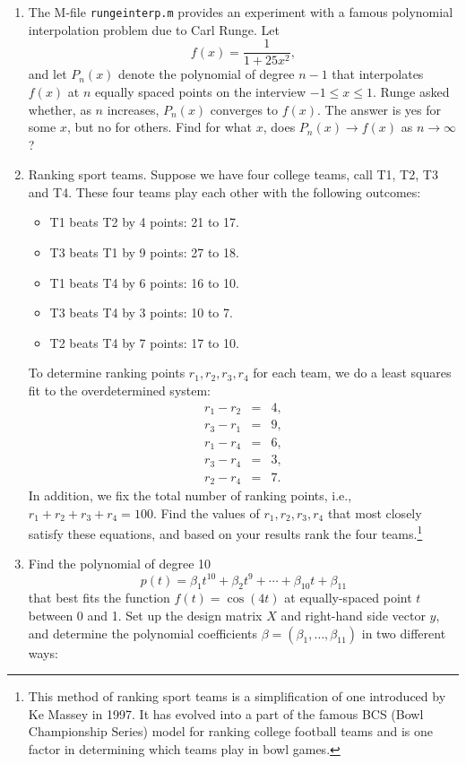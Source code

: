 {\begin{enumerate}
\item The M-file {\tt rungeinterp.m} provides an experiment with a famous
polynomial interpolation problem due to Carl Runge. Let
\[
f(x) = \frac{1}{1 + 25 x^2}, 
\] 
and let $P_n(x)$ denote the polynomial of degree $n-1$ that interpolates 
$f(x)$ at $n$ equally spaced points on the interview $-1 \leq x \leq 1$. Runge 
asked whether, as $n$ increases, $P_n(x)$ converges to $f(x)$. 
The answer is yes for some $x$, but no for others. 
Find for what $x$, does $P_n(x) \rightarrow f(x)$ as $n \rightarrow \infty$? 

\newpage
\item Ranking sport teams. Suppose we
have four college teams, call T1, T2, T3 and T4. These four teams
play each other with the following outcomes: 
\begin{itemize} 
\item T1 beats T2 by 4 points: 21 to 17.
\item T3 beats T1 by 9 points: 27 to 18.
\item T1 beats T4 by 6 points: 16 to 10.
\item T3 beats T4 by 3 points: 10 to 7.
\item T2 beats T4 by 7 points: 17 to 10.
\end{itemize} 
To determine ranking points $r_1, r_2, r_3, r_4$ for each team, we do a least
squares fit to the overdetermined system: 
\begin{eqnarray*} 
r_1 - r_2 & = & 4, \\
r_3 - r_1 & = & 9, \\ 
r_1 - r_4 & = & 6, \\ 
r_3 - r_4 & = & 3, \\ 
r_2 - r_4 & = & 7. 
\end{eqnarray*} 
In addition, we fix the total number of ranking points, i.e., 
$r_1 + r_2 + r_3 + r_4 = 100$. Find the values of $r_1, r_2, r_3, r_4$
that most closely satisfy these equations, and based on your results rank the 
four teams.\footnote{This method of ranking sport teams is a simplification of one
introduced by Ke Massey in 1997. It has evolved into a part of the famous 
BCS (Bowl Championship Series) model for ranking college football teams and is one 
factor in determining which teams play in bowl games.}

\item Find the polynomial of degree 10
\[
p(t) = \beta_1 t^{10} + \beta_2 t^{9} + \cdots + \beta_{10}t + \beta_{11}  
\]
that best fits the function
$f(t) = \cos(4t)$ at equally-spaced point $t$ between 0 and 1.
Set up the design matrix $X$ and right-hand side  vector $y$, and
determine the polynomial coefficients $\beta = (\beta_1, \ldots, \beta_{11})$
in two different ways:


\end{enumerate}}
